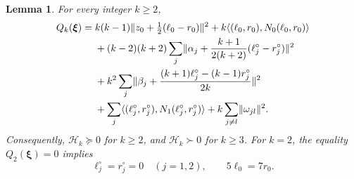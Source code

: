 \documentclass[11pt]{article}
\newtheorem{lemma}[theorem]{Lemma}
\newcommand{\gH}{\mathscr H}
\newcommand{\ip}[2]{\langle #1,#2\rangle}
\newcommand{\nrm}[1]{\lVert #1\rVert}
\begin{document}
\begin{lemma}\label{lem:Gram-positive}
For every integer \(k\ge2\),
\begin{align}
 Q_k(\boldsymbol{\xi})
 ={}&k(k-1)\nrm{z_0+\tfrac12(\ell_0-r_0)}^2
       +k\ip{(\ell_0,r_0)}{N_0(\ell_0,r_0)}
       \notag\\
 &+(k-2)(k+2)\sum_j
    \nrm{\alpha_j+\frac{k+1}{2(k+2)}
                    (\ell_j^\circ-r_j^\circ)}^2
       \notag\\
 &+k^2\sum_j
    \nrm{\beta_j+
             \frac{(k+1)\ell_j^\circ-(k-1)r_j^\circ}{2k}}^2
       \notag\\
 &+\sum_j\ip{(\ell_j^\circ,r_j^\circ)}
                   {N_1(\ell_j^\circ,r_j^\circ)}
       +k\sum_{j\ne l}\nrm{\omega_{jl}}^2.
 \label{eq:completed-Gram}
\end{align}
Consequently, \(\gH_k\succeq0\) for \(k\ge2\), and
\(\gH_k\succ0\) for \(k\ge3\).
For \(k=2\), the equality \(Q_2(\boldsymbol{\xi})=0\) implies
\begin{equation}\label{eq:k2-kernel}
 \ell_j^\circ=r_j^\circ=0\quad(j=1,2),
 \qquad 5\ell_0=7r_0.
\end{equation}
\end{lemma}
\end{document}
